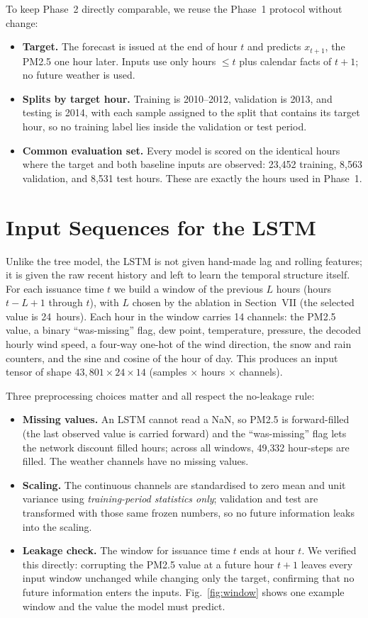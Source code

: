 \documentclass[onecolumn,11pt,journal]{IEEEtran}
\begin{document}
To keep Phase~2 directly comparable, we reuse the Phase~1 protocol without change:
\begin{itemize}
\item \textbf{Target.} The forecast is issued at the end of hour $t$ and predicts $x_{t+1}$, the PM2.5 one hour later. Inputs use only hours $\le t$ plus calendar facts of $t+1$; no future weather is used.
\item \textbf{Splits by target hour.} Training is 2010--2012, validation is 2013, and testing is 2014, with each sample assigned to the split that contains its target hour, so no training label lies inside the validation or test period.
\item \textbf{Common evaluation set.} Every model is scored on the identical hours where the target and both baseline inputs are observed: 23{,}452 training, 8{,}563 validation, and 8{,}531 test hours. These are exactly the hours used in Phase~1.
\end{itemize}

\section{Input Sequences for the LSTM}
Unlike the tree model, the LSTM is not given hand-made lag and rolling features; it is given the raw recent history and left to learn the temporal structure itself. For each issuance time $t$ we build a window of the previous $L$ hours (hours $t-L+1$ through $t$), with $L$ chosen by the ablation in Section~VII (the selected value is 24~hours). Each hour in the window carries 14 channels: the PM2.5 value, a binary ``was-missing'' flag, dew point, temperature, pressure, the decoded hourly wind speed, a four-way one-hot of the wind direction, the snow and rain counters, and the sine and cosine of the hour of day. This produces an input tensor of shape $43{,}801 \times 24 \times 14$ (samples $\times$ hours $\times$ channels).

Three preprocessing choices matter and all respect the no-leakage rule:
\begin{itemize}
\item \textbf{Missing values.} An LSTM cannot read a NaN, so PM2.5 is forward-filled (the last observed value is carried forward) and the ``was-missing'' flag lets the network discount filled hours; across all windows, 49{,}332 hour-steps are filled. The weather channels have no missing values.
\item \textbf{Scaling.} The continuous channels are standardised to zero mean and unit variance using \emph{training-period statistics only}; validation and test are transformed with those same frozen numbers, so no future information leaks into the scaling.
\item \textbf{Leakage check.} The window for issuance time $t$ ends at hour $t$. We verified this directly: corrupting the PM2.5 value at a future hour $t+1$ leaves every input window unchanged while changing only the target, confirming that no future information enters the inputs. Fig.~\ref{fig:window} shows one example window and the value the model must predict.
\end{itemize}
\end{document}
